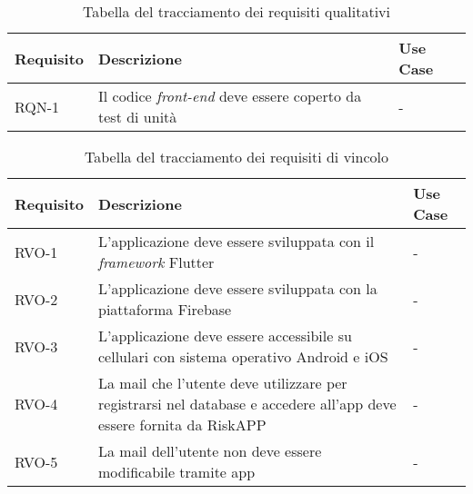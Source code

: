 
\begin{table}[htb]%
\caption{Tabella del tracciamento dei requisiti qualitativi}
\label{tab:requisiti-qualitativi}
\begin{tabularx}{\textwidth}{lXl}
\hline
\textbf{Requisito} & \textbf{Descrizione} & \textbf{Use Case}\\
\hline\hline
RQN-1    & Il codice \emph{front-end} deve essere coperto da test di unità & - \\
\hline
\end{tabularx}
\end{table}%


\begin{table}[htb]%
\caption{Tabella del tracciamento dei requisiti di vincolo}
\label{tab:requisiti-vincolo}
\begin{tabularx}{\textwidth}{lXl}
\hline
\textbf{Requisito} & \textbf{Descrizione} & \textbf{Use Case}\\
\hline\hline
RVO-1    & L'applicazione deve essere sviluppata con il \emph{framework} Flutter & - \\
\hline
RVO-2    & L'applicazione deve essere sviluppata con la piattaforma Firebase & - \\
\hline
RVO-3    & L'applicazione deve essere accessibile su cellulari con sistema operativo Android e iOS & - \\
\hline
RVO-4    & La mail che l'utente deve utilizzare per registrarsi nel database e accedere all'app deve essere fornita da RiskAPP & - \\
\hline
RVO-5    & La mail dell'utente non deve essere modificabile tramite app & - \\
\hline
\end{tabularx}
\end{table}%
